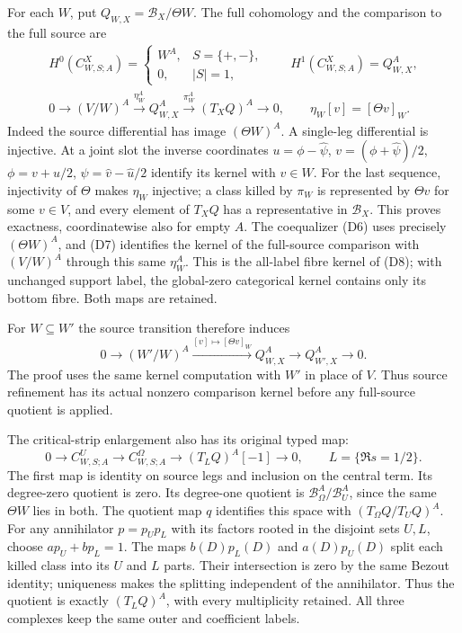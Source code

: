 For each $W$, put $Q_{W,X}=\mathscr B_X/\Theta W$.  The full
cohomology and the comparison to the full source are
\[
\begin{gathered}
H^0(C_{W,S;A}^X)=
 \begin{cases}W^A,&S=\{+,-\},\\0,&|S|=1,\end{cases}
\qquad H^1(C_{W,S;A}^X)=Q_{W,X}^A,\\
0\longrightarrow(V/W)^A\xrightarrow{\eta_W^A}Q_{W,X}^A
 \xrightarrow{\pi_W^A}(T_XQ)^A\longrightarrow0,
\qquad \eta_W[v]=[\Theta v]_W.
\tag{D11}
\end{gathered}
\]
Indeed the source differential has image $(\Theta W)^A$.  A
single-leg differential is injective.  At a joint slot the inverse
coordinates $u=\phi-\widehat\psi$, $v=(\phi+\widehat\psi)/2$,
$\phi=v+u/2$, $\psi=\widehat v-\widehat u/2$ identify its kernel
with $v\in W$.  For the last sequence, injectivity of $\Theta$
makes $\eta_W$ injective; a class killed by $\pi_W$ is represented
by $\Theta v$ for some $v\in V$, and every element of $T_XQ$ has
a representative in $\mathscr B_X$.  This proves exactness,
coordinatewise also for empty $A$.
The coequalizer (D6) uses precisely $(\Theta W)^A$, and (D7)
identifies the kernel of the full-source comparison with $(V/W)^A$
through this same $\eta_W^A$.  This is the all-label fibre kernel
of (D8); with unchanged support label, the global-zero categorical
kernel contains only its bottom fibre.  Both maps are retained.

For $W\subseteq W'$ the source transition therefore induces
\[
0\longrightarrow(W'/W)^A\xrightarrow{[v]\mapsto[\Theta v]_W}
 Q_{W,X}^A\longrightarrow Q_{W',X}^A\longrightarrow0.
\tag{D12}
\]
The proof uses the same kernel computation with $W'$ in place of
$V$.  Thus source refinement has its actual nonzero comparison
kernel before any full-source quotient is applied.

The critical-strip enlargement also has its original typed map:
\[
0\longrightarrow C_{W,S;A}^{U}\longrightarrow C_{W,S;A}^{\Omega}
 \longrightarrow(T_LQ)^A[-1]\longrightarrow0,
\qquad L=\{\Re s=1/2\}.
\tag{D13}
\]
The first map is identity on source legs and inclusion on the
central term.  Its degree-zero quotient is zero.  Its degree-one
quotient is $\mathscr B_\Omega^A/\mathscr B_U^A$, since the same
$\Theta W$ lies in both.  The quotient map $q$ identifies this
space with $(T_\Omega Q/T_UQ)^A$.  For any annihilator
$p=p_Up_L$ with its factors rooted in the disjoint sets $U,L$,
choose $ap_U+bp_L=1$.  The maps $b(D)p_L(D)$ and $a(D)p_U(D)$
split each killed class into its $U$ and $L$ parts.  Their
intersection is zero by the same Bezout identity; uniqueness makes
the splitting independent of the annihilator.  Thus the quotient
is exactly $(T_LQ)^A$, with every multiplicity retained.  All
three complexes keep the same outer and coefficient labels.

